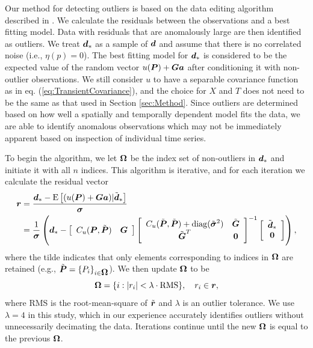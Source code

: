 \documentclass[extra,mreferee]{gji}
\begin{document}
Our method for detecting outliers is based on the data editing algorithm described in \citet{Gibbs2011}. We calculate the residuals between the observations and a best fitting model. Data with residuals that are anomalously large are then identified as outliers. We treat $\mitbf{d}_*$ as a sample of $\mitbf{d}$ and assume that there is no correlated noise (i.e., $\eta(p) = 0$).  The best fitting model for $\mitbf{d}_*$ is considered to be the expected value of the random vector $u(\mitbf{P}) + \mitbf{G}\mitbf{a}$ after conditioning it with non-outlier observations.  We still consider $u$ to have a separable covariance function as in eq. (\ref{eq:TransientCovariance}), and the choice for $X$ and $T$ does not need to be the same as that used in Section \ref{sec:Method}. Since outliers are determined based on how well a spatially and temporally dependent model fits the data, we are able to identify anomalous observations which may not be immediately apparent based on inspection of individual time series. 

To begin the algorithm, we let $\mitbf{\Omega}$ be the index set of non-outliers in $\mitbf{d}_*$ and initiate it with all $n$ indices. This algorithm is iterative, and for each iteration we calculate the residual vector
\begin{align}\label{eq:Residual}
\mitbf{r} &= \frac{\mitbf{d}_* - \mathrm{E}\left[(u(\mitbf{P}) + \mitbf{G}\mitbf{a})|\tilde{\mitbf{d}}_* \right]}{\mitbf{\sigma}} \\
       &= \frac{1}{\mitbf{\sigma}}\left(\mitbf{d}_*  - 
          \left[\begin{array}{cc}
                C_u(\mitbf{P},\tilde{\mitbf{P}}) & \mitbf{G} \\
                \end{array}\right]
          \left[\begin{array}{cc}
                C_u(\tilde{\mitbf{P}},\tilde{\mitbf{P}}) + \mathrm{diag}(\tilde{\mitbf{\sigma}}^2) & \tilde{\mitbf{G}} \\
                \tilde{\mitbf{G}}^T  & \mitbf{0} \\
                \end{array}\right]^{-1}
          \left[\begin{array}{c}
                \tilde{\mitbf{d}}_* \\
                \mitbf{0} \\
                \end{array}\right]\right),
\end{align}
where the tilde indicates that only elements corresponding to indices in $\mitbf{\Omega}$ are retained (e.g., $\tilde{\mitbf{P}} = \{P_i\}_{i\in\mitbf{\Omega}}$). We then update $\mitbf{\Omega}$ to be
\begin{equation}\label{eq:Update}
\mitbf{\Omega} = \{i : |r_i| < \lambda \cdot \mathrm{RMS}\}, \ \ \ r_i \in \mitbf{r},
\end{equation} 
where RMS is the root-mean-square of $\tilde{\mitbf{r}}$ and $\lambda$ is an outlier tolerance. We use $\lambda=4$ in this study, which in our experience accurately identifies outliers without unnecessarily decimating the data. Iterations continue until the new $\mitbf{\Omega}$ is equal to the previous $\mitbf{\Omega}$. 
\end{document}
